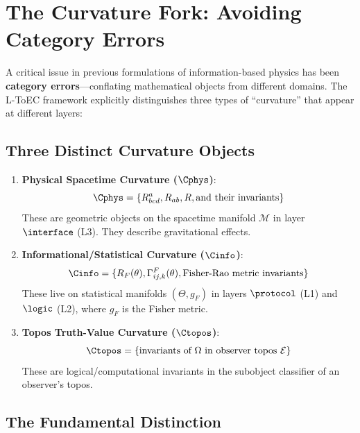 
\section{The Curvature Fork: Avoiding Category Errors}

A critical issue in previous formulations of information-based physics has been \textbf{category errors}—conflating mathematical objects from different domains. The L-ToEC framework explicitly distinguishes three types of ``curvature'' that appear at different layers:

\subsection{Three Distinct Curvature Objects}

\begin{enumerate}
    \item \textbf{Physical Spacetime Curvature ($\Cphys$)}:
    \[
    \Cphys = \{R^a_{bcd}, R_{ab}, R, \text{and their invariants}\}
    \]
    These are geometric objects on the spacetime manifold $\mathcal{M}$ in layer $\interface$ (L3). They describe gravitational effects.
    
    \item \textbf{Informational/Statistical Curvature ($\Cinfo$)}:
    \[
    \Cinfo = \{R_F(\theta), \Gamma^F_{ij,k}(\theta), \text{Fisher-Rao metric invariants}\}
    \]
    These live on statistical manifolds $(\Theta, g_F)$ in layers $\protocol$ (L1) and $\logic$ (L2), where $g_F$ is the Fisher metric.
    
    \item \textbf{Topos Truth-Value Curvature ($\Ctopos$)}:
    \[
    \Ctopos = \{\text{invariants of } \Omega \text{ in observer topos } \mathcal{E}\}
    \]
    These are logical/computational invariants in the subobject classifier of an observer's topos.
\end{enumerate}

\subsection{The Fundamental Distinction}

